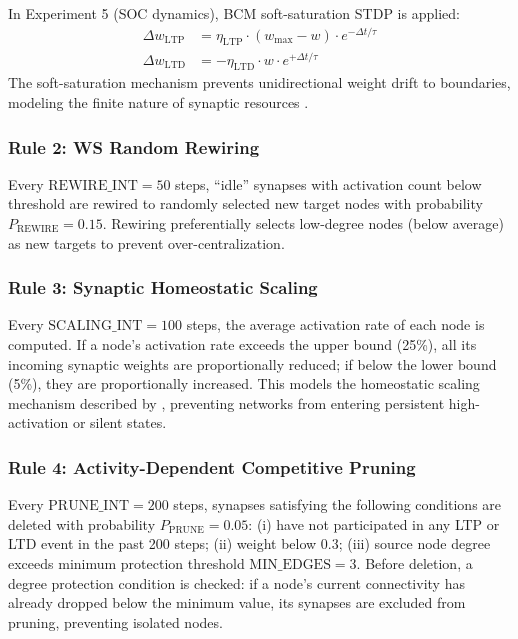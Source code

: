 \documentclass[12pt,a4paper]{article}
\begin{document}
In Experiment 5 (SOC dynamics), BCM soft-saturation STDP \citep{bear1987} is applied:
\begin{align}
\Delta w_{\text{LTP}} &= \eta_{\text{LTP}} \cdot (w_{\text{max}} - w) \cdot e^{-\Delta t/\tau} \label{eq:bcm_ltp}\\
\Delta w_{\text{LTD}} &= -\eta_{\text{LTD}} \cdot w \cdot e^{+\Delta t/\tau} \label{eq:bcm_ltd}
\end{align}
The soft-saturation mechanism prevents unidirectional weight drift to boundaries, modeling the finite nature of synaptic resources \citep{bhatt2009}.

\subsubsection{Rule 2: WS Random Rewiring}
Every $\text{REWIRE\_INT}=50$ steps, ``idle'' synapses with activation count below threshold are rewired to randomly selected new target nodes with probability $P_{\text{REWIRE}}=0.15$. Rewiring preferentially selects low-degree nodes (below average) as new targets to prevent over-centralization.

\subsubsection{Rule 3: Synaptic Homeostatic Scaling}
Every $\text{SCALING\_INT}=100$ steps, the average activation rate of each node is computed. If a node's activation rate exceeds the upper bound (25\%), all its incoming synaptic weights are proportionally reduced; if below the lower bound (5\%), they are proportionally increased. This models the homeostatic scaling mechanism described by \citet{turrigiano1998}, preventing networks from entering persistent high-activation or silent states.

\subsubsection{Rule 4: Activity-Dependent Competitive Pruning}
Every $\text{PRUNE\_INT}=200$ steps, synapses satisfying the following conditions are deleted with probability $P_{\text{PRUNE}}=0.05$: (i) have not participated in any LTP or LTD event in the past 200 steps; (ii) weight below 0.3; (iii) source node degree exceeds minimum protection threshold $\text{MIN\_EDGES}=3$. Before deletion, a degree protection condition is checked: if a node's current connectivity has already dropped below the minimum value, its synapses are excluded from pruning, preventing isolated nodes.
\end{document}
